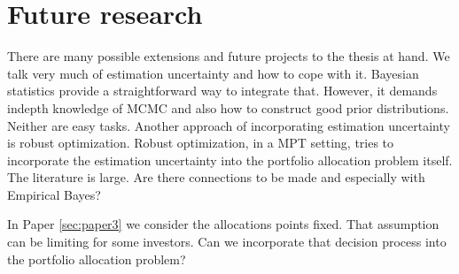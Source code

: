 \documentclass[oneside]{book}\usepackage{knitr}
\begin{document}
\chapter{Future research}\label{ch:future}


There are many possible extensions and future projects to the thesis at hand.
We talk very much of estimation uncertainty and how to cope with it.
Bayesian statistics provide a straightforward way to integrate that. 
However, it demands indepth knowledge of MCMC and also how to construct good prior distributions.
Neither are easy tasks.
Another approach of incorporating estimation uncertainty is robust optimization.
Robust optimization, in a MPT setting, tries to incorporate the estimation uncertainty into the portfolio allocation problem itself.
The literature is large. 
Are there connections to be made and especially with Empirical Bayes?

In Paper \ref{sec:paper3} we consider the allocations points fixed.
That assumption can be limiting for some investors.
Can we incorporate that decision process into the portfolio allocation problem?
\end{document}
